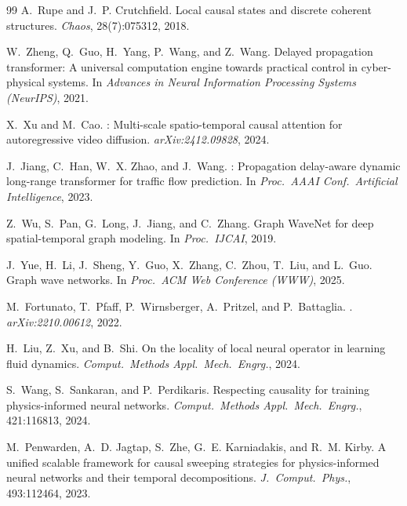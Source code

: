 \documentclass[10pt,twocolumn]{article}
\begin{document}
\begin{thebibliography}{99}
A.~Rupe and J.~P. Crutchfield.
\newblock Local causal states and discrete coherent structures.
\newblock \emph{Chaos}, 28(7):075312, 2018.


W.~Zheng, Q.~Guo, H.~Yang, P.~Wang, and Z.~Wang.
\newblock Delayed propagation transformer: A universal computation engine towards practical control in cyber-physical systems.
\newblock In \emph{Advances in Neural Information Processing Systems (NeurIPS)}, 2021.

X.~Xu and M.~Cao.
: Multi-scale spatio-temporal causal attention for autoregressive video diffusion.
\newblock \emph{arXiv:2412.09828}, 2024.


J.~Jiang, C.~Han, W.~X. Zhao, and J.~Wang.
: Propagation delay-aware dynamic long-range transformer for traffic flow prediction.
\newblock In \emph{Proc.\ AAAI Conf.\ Artificial Intelligence}, 2023.

Z.~Wu, S.~Pan, G.~Long, J.~Jiang, and C.~Zhang.
\newblock Graph {WaveNet} for deep spatial-temporal graph modeling.
\newblock In \emph{Proc.\ IJCAI}, 2019.

J.~Yue, H.~Li, J.~Sheng, Y.~Guo, X.~Zhang, C.~Zhou, T.~Liu, and L.~Guo.
\newblock Graph wave networks.
\newblock In \emph{Proc.\ ACM Web Conference (WWW)}, 2025.


M.~Fortunato, T.~Pfaff, P.~Wirnsberger, A.~Pritzel, and P.~Battaglia.
.
\newblock \emph{arXiv:2210.00612}, 2022.

H.~Liu, Z.~Xu, and B.~Shi.
\newblock On the locality of local neural operator in learning fluid dynamics.
\newblock \emph{Comput.\ Methods Appl.\ Mech.\ Engrg.}, 2024.


S.~Wang, S.~Sankaran, and P.~Perdikaris.
\newblock Respecting causality for training physics-informed neural networks.
\newblock \emph{Comput.\ Methods Appl.\ Mech.\ Engrg.}, 421:116813, 2024.

M.~Penwarden, A.~D. Jagtap, S.~Zhe, G.~E. Karniadakis, and R.~M. Kirby.
\newblock A unified scalable framework for causal sweeping strategies for physics-informed neural networks and their temporal decompositions.
\newblock \emph{J.\ Comput.\ Phys.}, 493:112464, 2023.

\end{thebibliography}
\end{document}
